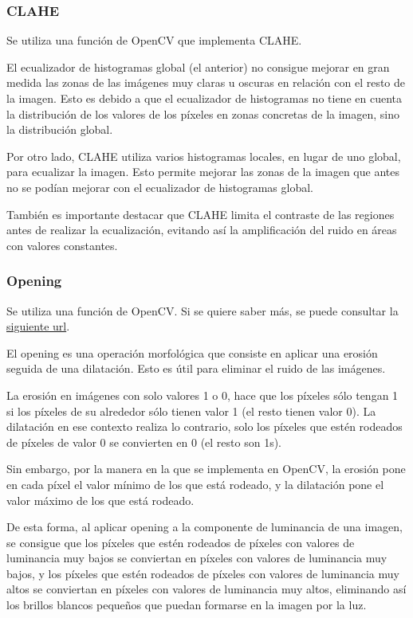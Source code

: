 \documentclass[12pt]{article}
\begin{document}
\subsubsection*{CLAHE}

Se utiliza una función de OpenCV que implementa CLAHE.

El ecualizador de histogramas global (el anterior) no consigue mejorar en gran medida las zonas de las imágenes muy claras u oscuras en relación con el resto de la imagen. Esto es debido a que el ecualizador de histogramas no tiene en cuenta la distribución de los valores de los píxeles en zonas concretas de la imagen, sino la distribución global.

Por otro lado, CLAHE utiliza varios histogramas locales, en lugar de uno global, para ecualizar la imagen. Esto permite mejorar las zonas de la imagen que antes no se podían mejorar con el ecualizador de histogramas global.

También es importante destacar que CLAHE limita el contraste de las regiones antes de realizar la ecualización, evitando así la amplificación del ruido en áreas con valores constantes.

\subsubsection*{Opening}

Se utiliza una función de OpenCV. Si se quiere saber más, se puede consultar la \href{https://docs.opencv.org/4.x/d9/d61/tutorial_py_morphological_ops.html#gsc.tab=0}{siguiente url}.

El opening es una operación morfológica que consiste en aplicar una erosión seguida de una dilatación. Esto es útil para eliminar el ruido de las imágenes.

La erosión en imágenes con solo valores 1 o 0, hace que los píxeles sólo tengan 1 si los píxeles de su alrededor sólo tienen valor 1 (el resto tienen valor 0). La dilatación en ese contexto realiza lo contrario, solo los píxeles que estén rodeados de píxeles de valor 0 se convierten en 0 (el resto son 1s).

Sin embargo, por la manera en la que se implementa en OpenCV, la erosión pone en cada píxel el valor mínimo de los que está rodeado, y la dilatación pone el valor máximo de los que está rodeado.

De esta forma, al aplicar opening a la componente de luminancia de una imagen, se consigue que los píxeles que estén rodeados de píxeles con valores de luminancia muy bajos se conviertan en píxeles con valores de luminancia muy bajos, y los píxeles que estén rodeados de píxeles con valores de luminancia muy altos se conviertan en píxeles con valores de luminancia muy altos, eliminando así los brillos blancos pequeños que puedan formarse en la imagen por la luz.
\end{document}
